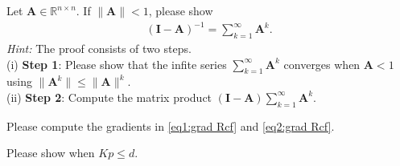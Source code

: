 \documentclass[../../book-main.tex]{subfiles}
\begin{document}
\begin{exercise}
\end{exercise}


\begin{exercise}\label{ex:neumannn} 
Let $\bm A \in \mathbb{R}^{n\times n}$. If $\|\bm A\| < 1$, please show 
\begin{align}\label{eq:neumann}
    \left( \bm I - \bm A\right)^{-1} = \sum_{k=1}^\infty \bm A^k.  
\end{align}
{\em Hint:} The proof consists of two steps. \\
(i) {\bf Step 1}: Please show that the infite series $\sum_{k=1}^\infty \bm A^k$ converges when $\bm A < 1$ using $\|\bm A^k\| \le \|\bm A\|^k$. \\
(ii) {\bf Step 2}: Compute the matrix product $(\bm I - \bm A) \sum_{k=1}^\infty \bm A^k$. 
\end{exercise}


\begin{exercise}
    Please compute the gradients in \eqref{eq1:grad Rcf} and \eqref{eq2:grad Rcf}. 
\end{exercise}


\begin{exercise}
    Please show  when $Kp \le d$. 
\end{exercise}
\end{document}
